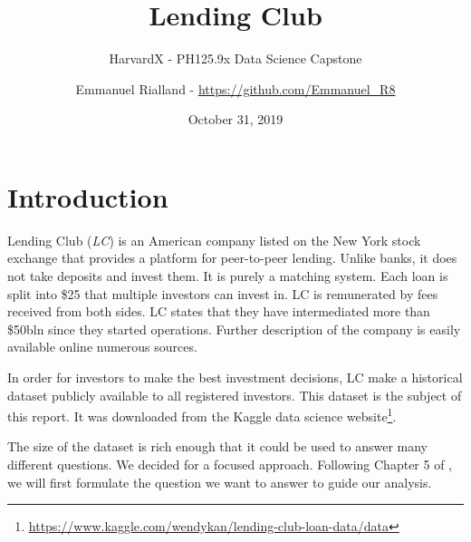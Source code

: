 \documentclass[11pt,]{report}
\title{Lending Club}
\subtitle{HarvardX - PH125.9x Data Science Capstone}
\author{Emmanuel Rialland - \url{https://github.com/Emmanuel_R8}}
\date{October 31, 2019}
\let\rmarkdownfootnote\footnote%
\def\footnote{\protect\rmarkdownfootnote}
\begin{document}
\maketitle

{
\hypersetup{linkcolor=black}
\setcounter{tocdepth}{2}
\tableofcontents
}
\listoftables
\listoffigures
\small

\normalsize

\small

\normalsize

\small

\normalsize

\small

\normalsize

\small

\normalsize

\hypertarget{introduction}{%
\chapter*{Introduction}\label{introduction}}

Lending Club (\emph{LC}) is an American company listed on the New York stock exchange that provides a platform for peer-to-peer lending. Unlike banks, it does not take deposits and invest them. It is purely a matching system. Each loan is split into \$25 that multiple investors can invest in. LC is remunerated by fees received from both sides. LC states that they have intermediated more than \$50bln since they started operations. Further description of the company is easily available online numerous sources.

In order for investors to make the best investment decisions, LC make a historical dataset publicly available to all registered investors. This dataset is the subject of this report. It was downloaded from the Kaggle data science website\footnote{\url{https://www.kaggle.com/wendykan/lending-club-loan-data/data}}.

The size of the dataset is rich enough that it could be used to answer many different questions. We decided for a focused approach. Following Chapter 5 of \citet{peng2012exploratory}, we will first formulate the question we want to answer to guide our analysis.
\end{document}
